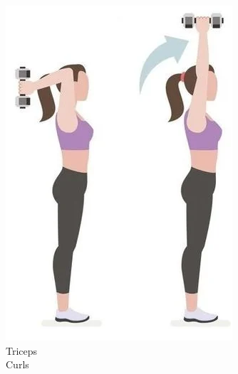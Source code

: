 \documentclass[journal]{IEEEtran}
\begin{document}
\begin{figure}[H]
\begin{minipage}[t][3.5cm][b]{0.1\textwidth}
\begin{figure}[H]
            \includegraphics[width=\textwidth]{figures/triceps.png}
            \caption{Triceps\\Curls \cite{noauthor_notitle_2021}}
            \label{ref:fig_kNN_activity_2}
        \end{figure}
    \end{minipage}
    \begin{minipage}[t][3.5cm][b]{0.12\textwidth}
        \begin{figure}[H]
            \centering

\end{figure}
\end{minipage}
\end{figure}
\end{document}
